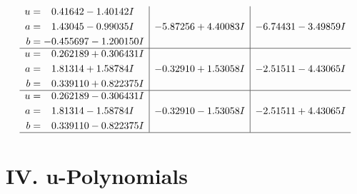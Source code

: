\documentclass[1p]{elsarticle_modified}
\theoremstyle{definition}
\begin{document}
$$\begin{array}{c|c|c}
\begin{aligned}
u &= \phantom{-}0.41642 - 1.40142 I \\
a &= \phantom{-}1.43045 - 0.99035 I \\
b &= -0.455697 - 1.200150 I\end{aligned}
 & -5.87256 + 4.40083 I & -6.74431 - 3.49859 I \\ \hline\begin{aligned}
u &= \phantom{-}0.262189 + 0.306431 I \\
a &= \phantom{-}1.81314 + 1.58784 I \\
b &= \phantom{-}0.339110 + 0.822375 I\end{aligned}
 & -0.32910 + 1.53058 I & -2.51511 - 4.43065 I \\ \hline\begin{aligned}
u &= \phantom{-}0.262189 - 0.306431 I \\
a &= \phantom{-}1.81314 - 1.58784 I \\
b &= \phantom{-}0.339110 - 0.822375 I\end{aligned}
 & -0.32910 - 1.53058 I & -2.51511 + 4.43065 I\\
 \hline 
 \end{array}$$\newpage
\newpage\renewcommand{\arraystretch}{1}
\centering \section*{ IV. u-Polynomials}
\end{document}
